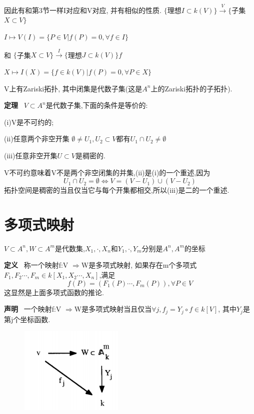 \documentclass[UTF8]{book}
\begin{document}
		因此有和第3节一样I对应和V对应, 并有相似的性质.
			   \center  $\{$理想$I\subset k(V)\}\stackrel{V}{\longrightarrow} \{$子集$X\subset V \}$



			  $ I \longmapsto V(I)=\{P\in V\vert f(P)=0,\forall f \in I \}$

		\justifying
		和
			\center  $\{$子集$X\subset V \}\stackrel{I}{\longrightarrow} \{$理想$J\subset k(V)\}f$


			   $ X \longmapsto I(X)=\{f\in k(V)\vert f(P)=0,\forall P \in X\}$

		\justifying
		V上有Zariski拓扑, 其中闭集是代数子集(这是$A^{n}$上的Zariski拓扑的子拓扑).

		\textbf{定理} \ $V\subset A^{n}$是代数子集,下面的条件是等价的:

		(i)V是不可约的;

		(ii)任意两个非空开集 $\emptyset \neq U_{1},U_{2} \subset V $都有$U_{1} \cap U_{2}\neq \emptyset$

		(iii)任意非空开集$U\subset V$是稠密的.

		V不可约意味着V不是两个非空闭集的并集,(ii)是(i)的一个重述,因为
		\begin{equation*}
		U_{1}\cap U_{2}=\emptyset \Longleftrightarrow V=(V-U_{1})\cup (V-U_{2})
		\end{equation*}
		拓扑空间是稠密的当且仅当它与每个开集都相交,所以(iii)是二的一个重述.

	\section{多项式映射} $V\subset A^{n},W\subset A^{m}$是代数集,$X_{1},\cdot,X_{n}$和$Y_{1},\cdot,Y_{m}$分别是$A^{n},A^{m}$的坐标

		\textbf{定义} \ 称一个映射f:V $\Rightarrow $W是多项式映射, 如果存在m个多项式$F_{1},F_{2}\cdots,F_{m}\in k[X_{1},X_{2}\cdots,X_{n}]$,满足
		\begin{equation*}
		f(P)=(F_{1}(P)\cdots,F_{m}(P)), \forall  P\in V
		\end{equation*}
		这显然是上面多项式函数的推论.

		\textbf{声明} \ 一个映射f:V $\Rightarrow $W是多项式映射当且仅当$\forall  j, f_{j}=Y_{j}\circ f \in k[V]$, 其中$Y_{j}$是第j个坐标函数.
		\begin{figure}[h]
		  \centering
		  \includegraphics[width=5cm]{68.jpg}\\
		\end{figure}
\end{document}
